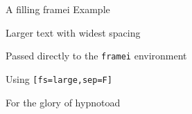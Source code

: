 \documentclass[11pt,compress,t,notes=noshow, xcolor=table]{beamer}
\begin{document}

\begin{framei}[fs=large,sep=F]{A filling framei Example}
  \item Larger text with widest spacing
  \item Passed directly to the \texttt{framei} environment
  \item Using \texttt{[fs=large,sep=F]}
  \item For the glory of hypnotoad
\end{framei}

\endlecture
\end{document}
